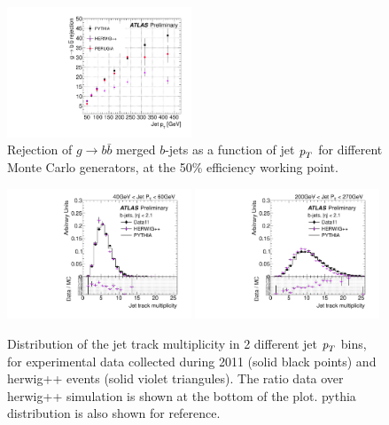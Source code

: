 


\begin{figure}[tp]
\centering
\includegraphics[width=0.49\textwidth]{gbbRejection_vs_PT_3MonteCarlos_50Eff.pdf}
\caption{Rejection of $g\rightarrow b \bar{b}$ merged $b$-jets as a function of jet ${\emph{p}_{T}}$ for different Monte Carlo generators, at the 50\% efficiency working point.}
\label{fig:performanceotherMC}
\end{figure}

\begin{figure}[tp]
\centering
\includegraphics[width=0.49\textwidth]{FIGS/systematics/DataVarNtrkPT040.pdf}
\includegraphics[width=0.49\textwidth]{FIGS/systematics/DataVarNtrkPT200.pdf}
\caption{Distribution of the jet track multiplicity in 2 different jet ${\emph{p}_{T}}$ bins, for experimental data  collected during 2011 (solid black points) and {\sc herwig}++ events (solid violet triangules). The ratio data over {\sc herwig}++ simulation is shown at the bottom of the plot. {\sc pythia} distribution is also shown for reference.}
\label{fig:herwigdatamc}
\end{figure}



